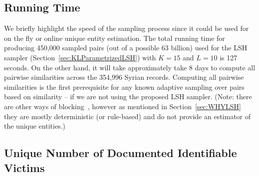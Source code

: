 \documentclass{imsart}
\begin{document}


\subsection{Running Time}
We briefly highlight the speed of the sampling process since it could be used for on the fly or online unique entity estimation.
The total running time for producing 450,000 sampled pairs (out of a possible 63 billion) used for the LSH sampler (Section~\ref{sec:KLParametrizedLSH}) with $K=15$ and $L=10$ is 127 seconds. On the other hand, it will take approximately take 8 days to compute all pairwise similarities across the 354,996 Syrian records. Computing all pairwise similarities is the first prerequisite for any known adaptive sampling over pairs based on similarity -- if we are not using the proposed LSH sampler.
(Note: there are other ways of blocking~\citep{christen_2012}, however as mentioned in Section~\ref{sec:WHYLSH} they are mostly deterministic (or rule-based) and do not provide an estimator of the unique entities.)


\subsection{Unique Number of Documented Identifiable Victims}
\end{document}
